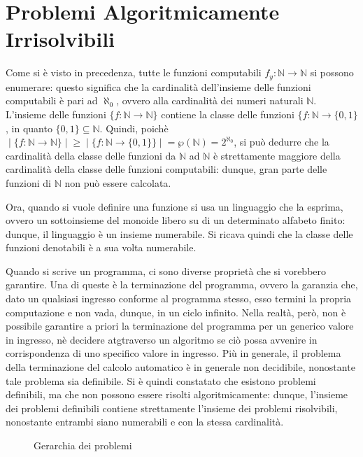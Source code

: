   \section{Problemi Algoritmicamente Irrisolvibili}
  Come si è visto in precedenza, tutte le funzioni computabili \(f_y:\mathbb{N}\to\mathbb{N}\) si possono enumerare: questo significa che la cardinalità dell'insieme delle funzioni computabili è pari ad \(\aleph_0\), ovvero alla cardinalità dei numeri naturali \(\mathbb{N}\). L'insieme delle funzioni \(\{f:\mathbb{N}\to\mathbb{N}\}\) contiene la classe delle funzioni \(\{f:\mathbb{N}\to\{0,1\}\), in quanto \(\{0,1\}\subseteq \mathbb{N}\). Quindi, poichè \(\;|\;\{f:\mathbb{N}\to\mathbb{N}\}\;|\; \ge \;|\;\{f:\mathbb{N}\to\{0,1\}\}\;|\; = \wp (\mathbb{N}) = 2^{\aleph_0}\), si può dedurre che la cardinalità della classe delle funzioni da \(\mathbb{N}\) ad \(\mathbb{N}\) è strettamente maggiore della cardinalità della classe delle funzioni computabili: dunque, gran parte delle funzioni di \(\mathbb{N}\) non può essere calcolata. 

  Ora, quando si vuole definire una funzione si usa un linguaggio che la esprima, ovvero un sottoinsieme del monoide libero su di un determinato alfabeto finito: dunque, il linguaggio è un insieme numerabile. Si ricava quindi che la classe delle funzioni denotabili è a sua volta numerabile.

  Quando si scrive un programma, ci sono diverse proprietà che si vorebbero garantire. Una di queste è la terminazione del programma, ovvero la garanzia che, dato un qualsiasi ingresso conforme al programma stesso, esso termini la propria computazione e non vada, dunque, in un ciclo infinito. Nella realtà, però, non è possibile garantire a priori la terminazione del programma per un generico valore in ingresso, nè decidere atgtraverso un algoritmo se ciò possa avvenire in corrispondenza di uno specifico valore in ingresso. Più in generale, il problema della terminazione del calcolo automatico è in generale non decidibile, nonostante tale problema sia definibile.
  Si è quindi constatato che esistono problemi definibili, ma che non possono essere risolti algoritmicamente: dunque, l'insieme dei problemi definibili contiene strettamente l'insieme dei problemi risolvibili, nonostante entrambi siano numerabili e con la stessa cardinalità.

  \begin{figure}[!h]
    \begin{center}    
    \end{center}
    \caption{Gerarchia dei problemi}    
  \end{figure}

